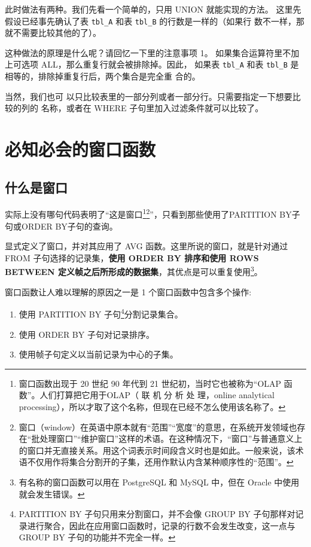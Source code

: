此时做法有两种。我们先看一个简单的，只用 UNION 就能实现的方法。
这里先假设已经事先确认了表 \verb|tbl_A| 和表 \verb|tbl_B| 的行数是一样的（如果行
数不一样，那就不需要比较其他的了）。

这种做法的原理是什么呢？请回忆一下里的注意事项 1。
如果集合运算符里不加上可选项 ALL，那么重复行就会被排除掉。因此，
如果表 \verb|tbl_A| 和表 \verb|tbl_B| 是相等的，排除掉重复行后，两个集合是完全重
合的。

当然，我们也可
以只比较表里的一部分列或者一部分行。只需要指定一下想要比较的列的
名称，或者在 WHERE 子句里加入过滤条件就可以比较了。

\section{必知必会的窗口函数}
\subsection{什么是窗口}
实际上没有哪句代码表明了“这是窗口\footnote{窗口函数出现于 20 世纪 90 年代到 21 世纪初，当时它也被称为“OLAP 函数”。人们打算把它用于OLAP（ 联 机 分 析 处 理，online analytical processing），所以才取了这个名称，但现在已经不怎么使用该名称了。}\footnote{窗口（window）在英语中原本就有“范围”“宽度”的意思，在系统开发领域也存在“批处理窗口”“维护窗口”这样的术语。在这种情况下，“窗口”与普通意义上的窗口并无直接关系。用这个词表示时间段含义时也是如此。一般来说，该术语不仅用作将集合分割开的子集，还用作默认内含某种顺序性的“范围”。}”，只看到那些使用了\textsf{PARTITION BY}子句或\textsf{ORDER BY}子句的查询。

显式定义了窗口，并对其应用了 AVG 函数。这里所说的窗口，就是针对通过 FROM 子句选择的记录集，\textbf{使用 ORDER BY 排序和使用 ROWS BETWEEN 定义帧之后所形成的数据集}，其优点是可以重复使用\footnote{有名称的窗口函数可以用在 PostgreSQL 和 MySQL 中，但在 Oracle 中使用就会发生错误。}。

窗口函数让人难以理解的原因之一是 1 个窗口函数中包含多个操作:
\begin{enumerate}
    \item 使用 PARTITION BY 子句\footnote{PARTITION BY 子句只用来分割窗口，并不会像 GROUP BY 子句那样对记录进行聚合，因此在应用窗口函数时，记录的行数不会发生改变，这一点与 GROUP BY 子句的功能并不完全一样。}分割记录集合。
    \item 使用 ORDER BY 子句对记录排序。
    \item 使用帧子句定义以当前记录为中心的子集。
\end{enumerate}

